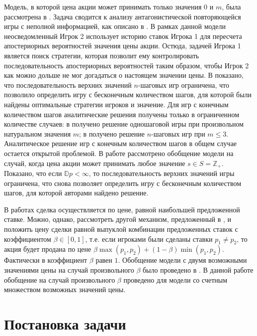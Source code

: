 \documentclass[12pt, draft]{extarticle}
\begin{document}
Модель, в которой цена акции может принимать только значения $0$ и $m$, была
рассмотрена в \cite{bib:domansky07}. Задача сводится к анализу антагонистической
повторяющейся игры с неполной информацией, как описано в \cite{bib:aumann}. В
рамках данной модели неосведомленный Игрок 2 использует историю ставок Игрока 1
для пересчета апостериорных вероятностей значения цены акции. Остюда, задачей
Игрока 1 является поиск стратегии, которая позволит ему контролировать
последовательность апостериорных вероятностей таким образом, чтобы Игрок 2 как
можно дольше не мог догадаться о настоящем значении цены. В
\cite{bib:domansky07} показано, что последовательность верхних значений
$n$-шаговых игр ограничена, что позволило определить игру с бесконечным
количеством шагов, для которой были найдены оптимальные стратегии игроков и
значение.
%
Для игр с конечным количеством шагов аналитические решения получены только в
ограниченном количестве случаев: в \cite{bib:sandomirskaya12} получено решение
одношаговой игры при произвольном натуральном значения $m$; в \cite{bib:kreps09}
получено решение $n$-шаговых игр при $m \leqslant 3$. Аналитическое решение игр
с конечным количеством шагов в общем случае остается открытой проблемой.
%
В работе \cite{bib:domansky11} рассмотрено обобщение модели на случай, когда
цена акции может принимать любое значение $s \in S = \mathbb{Z}_+$. Показано,
что если $\mathbb{D} p < \infty$, то последовательность верхних значений игры
ограничена, что снова позволяет определить игру с бесконечным количеством шагов,
для которой авторами найдено решение.

В работах \cite{bib:domansky07, bib:domansky11} сделка осуществляется по цене,
равной наибольшей предложенной ставке. Можно, однако, рассмотреть другой
механизм, предложенный в \cite{bib:chatterjee83}, и положить цену сделки равной
выпуклой комбинации предложенных ставок с коэффициентом $\beta \in [0,1]$, т.е.
если игроками были сделаны ставки $p_1 \neq p_2$, то акция будет продана по цене
$\beta \max(p_1, p_2) + (1-\beta) \min(p_1, p_2)$. Фактически в
\cite{bib:domansky07, bib:domansky11} коэффициент $\beta$ равен $1$. Обобщение
модели с двумя возможными значениями цены на случай произвольного $\beta$ было
проведено в \cite{bib:pyanykh16}. В данной работе обобщение на случай
произвольного $\beta$ проведено для модели со счетным множеством возможных
значений цены.

\section{Постановка задачи}
\label{sec:problem-statement}
\end{document}
